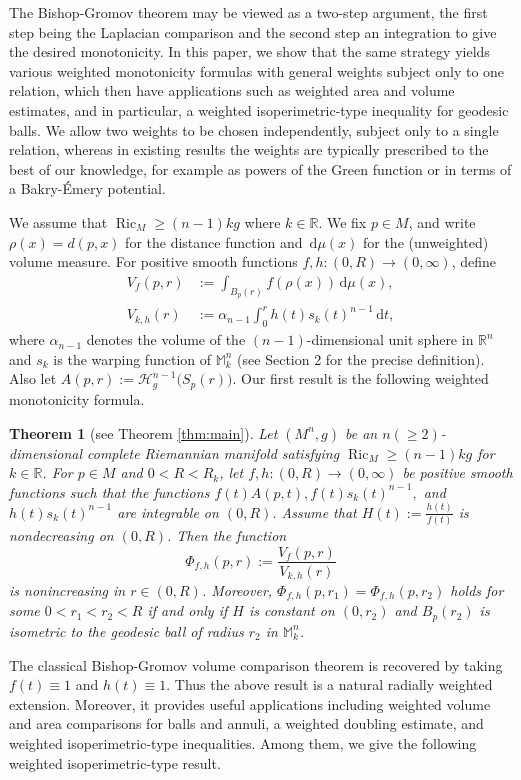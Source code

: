 \documentclass[11pt]{article}
\newtheorem{theorem}{Theorem}[section]
\newcommand{\Ric}{\operatorname{Ric}}
\newcommand{\dd}{\,\mathrm{d}}
\begin{document}
The Bishop-Gromov theorem may be viewed as a two-step argument, the first step being the Laplacian comparison and the second step an integration to give the desired monotonicity. In this paper, we show that the same strategy yields various weighted monotonicity formulas with general weights subject only to one relation, which then have applications such as weighted area and volume estimates, and in particular, a weighted isoperimetric-type inequality for geodesic balls. We allow two weights to be chosen independently, subject only to a single relation, whereas in existing results the weights are typically prescribed to the best of our knowledge, for example as powers of the Green function or in terms of a Bakry-\'Emery potential.

We assume that $\Ric_M\geq(n-1)kg$ where $k \in \mathbb{R}$. We fix $p\in M$, and write $\rho(x)=d(p,x)$ for the distance function and $\dd\mu(x)$ for the (unweighted) volume measure. For positive smooth functions $f,h\colon(0,R)\rightarrow(0,\infty)$, define
\begin{align*}
V_f(p,r) &:= \int_{B_p(r)}f(\rho(x))\dd\mu(x), \\
V_{k,h}(r) &:= \alpha_{n-1}\int_0^r h(t)s_k(t)^{n-1}\dd t,
\end{align*}
where $\alpha_{n-1}$ denotes the volume of the $(n-1)$-dimensional unit sphere in $\mathbb{R}^n$ and $s_k$ is the warping function of $\mathbb M_k^n$ (see Section 2 for the precise definition). Also let $A(p,r):=\mathcal H_g^{n-1}\bigl(S_p(r)\bigr)$. Our first result is the following weighted monotonicity formula.

\begin{theorem}[see Theorem \ref{thm:main}]
Let $(M^n,g)$ be an $n(\geq 2)$-dimensional complete Riemannian manifold satisfying $\Ric_M\geq(n-1)kg$ for \(k\in\mathbb{R}\). For \(p\in M\) and  \(0<R<R_k\), let $f,h\colon(0,R)\rightarrow(0,\infty)$ be positive smooth functions such that 
the functions $f(t)A(p,t), f(t)s_k(t)^{n-1},$ and $h(t)s_k(t)^{n-1}$ are integrable on \((0,R)\). Assume that $H(t):=\frac{h(t)}{f(t)}$ is nondecreasing on \((0,R)\). Then the function 
$$\Phi_{f,h}(p,r) := \frac{V_f(p,r)}{V_{k,h}(r)}$$
is nonincreasing in $r \in (0,R)$. Moreover, $\Phi_{f,h}(p,r_1)=\Phi_{f,h}(p,r_2)$ holds for some \(0<r_1<r_2<R\) if and only if \(H\) is constant on \((0,r_2)\) and $B_p(r_2)$ is isometric to the geodesic ball of radius $r_2$ in $\mathbb M_k^n$.
\end{theorem}

The classical Bishop-Gromov volume comparison theorem is recovered by taking $f(t)\equiv 1$ and $h(t)\equiv 1$. Thus the above result is a natural radially weighted extension. Moreover, it provides useful applications including weighted volume and area comparisons for balls and annuli, a weighted doubling estimate, and weighted isoperimetric-type inequalities. Among them, we give the following weighted isoperimetric-type result.
\end{document}
